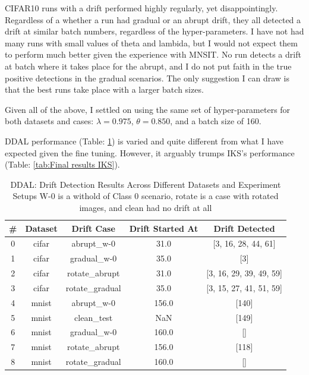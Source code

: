 \documentclass[a4paper]{article}
\begin{document}
CIFAR10 runs with a drift performed highly regularly, yet disappointingly. Regardless of a whether a run had gradual or an abrupt drift, they all detected a drift at similar batch numbers, regardless of the hyper-parameters. I have not had many runs with small values of theta and lambida, but I would not expect them to perform much better given the experience with MNSIT. No run detects a drift at batch where it takes place for the abrupt, and I do not put faith in the true positive detections in the gradual scenarios. The only suggestion I can draw is that the best runs take place with a larger batch sizes.

Given all of the above, I settled on using the same set of hyper-parameters for both datasets and cases: \(\lambda = 0.975\), \(\theta = 0.850\), and a batch size of 160.

DDAL performance (Table: \ref{tab:Final results DDAL})  is varied and quite different from what I have expected given the fine tuning. However, it arguably trumps IKS's performance (Table: \ref{tab:Final results IKS}). 
\begin{table}[]
    \centering
    \begin{tabular}{c|c|c|c|c}
        \# & Dataset & Drift Case & Drift Started At & Drift Detected \\
        \hline
        0 & cifar & abrupt\_w-0 & 31.0 & [3, 16, 28, 44, 61] \\
        1 & cifar & gradual\_w-0 & 35.0 & [3] \\
        2 & cifar & rotate\_abrupt & 31.0 & [3, 16, 29, 39, 49, 59] \\
        3 & cifar & rotate\_gradual & 35.0 & [3, 15, 27, 41, 51, 59] \\
        4 & mnist & abrupt\_w-0 & 156.0 & [140] \\
        5 & mnist & clean\_test & NaN & [149] \\
        6 & mnist & gradual\_w-0 & 160.0 & [] \\
        7 & mnist & rotate\_abrupt & 156.0 & [118] \\
        8 & mnist & rotate\_gradual & 160.0 & [] \\
    \end{tabular}
    \caption{DDAL: Drift Detection Results Across Different Datasets and Experiment Setups
    W-0 is a withold of Class 0 scenario, rotate is a case with rotated images, and clean had no drift at all}
    \label{tab:Final results DDAL}
\end{table}
\end{document}
